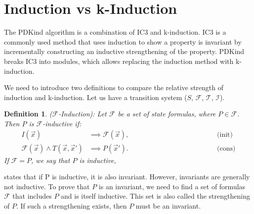 \section{Induction vs k-Induction}
\newtheorem{definition}{Definition}
\noindent The PDKind algorithm is a combination of IC3 and k-induction.
IC3\cite{6148908} is a commonly used method that uses induction to show a property is invariant by incrementally constructing an inductive strengthening of the property. PDKind \cite{7886665} breaks IC3 into modules, which allows replacing the induction method with k-induction.

We need to introduce two definitions to compare the relative strength of induction and k-induction. Let us have a transition system ($S$, $\mathcal{F}$, $\mathcal{T}$, $\mathcal{I}$).
\vspace{\baselineskip}
\begin{definition}
($\mathcal{F}$-Induction\cite{7886665}): Let $\mathcal{F}$ be a set of state formulas, where $P \in \mathcal{F}$. Then \( P \) is $\mathcal{F}$-inductive if:
\begin{align*}
    I(\vec{x})
    &\implies \mathcal{F}(\vec{x}), \hspace{5cm}&\text{(init)} \\
    \mathcal{F}(\vec{x}) \land T(\vec{x}, \vec{x}') &\implies P(\vec{x}'). \hspace{5cm}&\text{(cons)}
\end{align*}
If $\mathcal{F} = {P}$, we say that \( P \) is inductive,
\label{Def:ind}
\end{definition}

\vspace{\baselineskip}
\cite{7886665} states that if P is inductive, it is also invariant. However, invariants are generally not inductive. To prove that \( P \) is an invariant, we need to find a set of formulas $\mathcal{F}$ that includes \( P \) and is itself inductive. This set is also called the strengthening of \( P \). If such a strengthening exists, then \( P \) must be an invariant.

